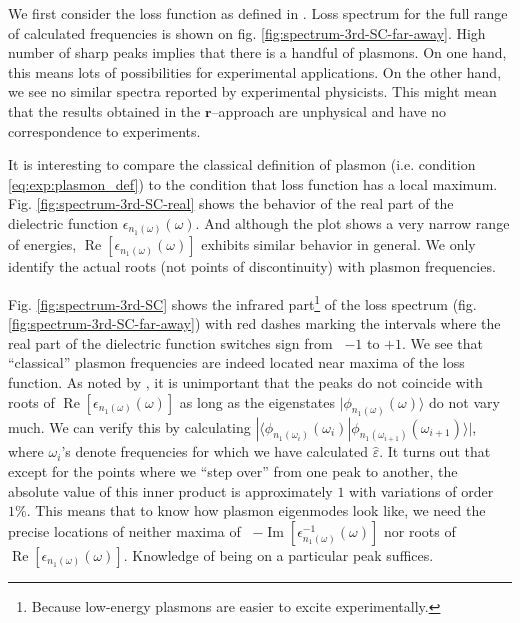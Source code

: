 \documentclass[a4paper,12pt]{article}
\begin{document}
    We first consider the loss function as defined in \cite{plasmonic2015}. Loss spectrum for the full range of calculated frequencies is shown on fig. \ref{fig:spectrum-3rd-SC-far-away}. High number of sharp peaks implies that there is a handful of plasmons. On one hand, this means lots of possibilities for experimental applications. On the other hand, we see no similar spectra reported by experimental physicists. This might mean that the results obtained in the $\mathbf{r}$--approach are unphysical and have no correspondence to experiments.
    
    It is interesting to compare the classical definition of plasmon (i.e. condition \eqref{eq:exp:plasmon_def}) to the condition that loss function has a local maximum. Fig. \ref{fig:spectrum-3rd-SC-real} shows the behavior of the real part of the dielectric function $\epsilon_{n_1(\omega)}(\omega)$. And although the plot shows a very narrow range of energies, $\operatorname{Re} [\epsilon_{n_1(\omega)}(\omega)]$ exhibits similar behavior in general. We only identify the actual roots (not points of discontinuity) with plasmon frequencies.
    
    Fig. \ref{fig:spectrum-3rd-SC} shows the infrared part\footnote{%
        Because low-energy plasmons are easier to excite experimentally. 
    } of the loss spectrum (fig. \ref{fig:spectrum-3rd-SC-far-away}) with red dashes marking the intervals where the real part of the dielectric function switches sign from \ $-1$ to $+1$. We see that ``classical'' plasmon frequencies are indeed located near maxima of the loss function. As noted by \cite{andersen2012spatially}, it is unimportant that the peaks do not coincide with roots of $\operatorname{Re} [\epsilon_{n_1(\omega)}(\omega)]$ as long as the eigenstates $|\phi_{n_1(\omega)}(\omega)\rangle$ do not vary much. We can verify this by calculating $|\langle \phi_{n_1(\omega_i)}(\omega_i) | \phi_{n_1(\omega_{i+1})}(\omega_{i+1}) \rangle|$, where $\omega_i$'s denote frequencies for which we have calculated $\hat\varepsilon$. It turns out that except for the points where we ``step over'' from one peak to another, the absolute value of this inner product is approximately $1$ with variations of order $1\%$. This means that to know how plasmon eigenmodes look like, we need the precise locations of neither  maxima of \ $-\operatorname{Im}[\epsilon_{n_1(\omega)}^{-1}(\omega)]$ nor roots of $\operatorname{Re} [\epsilon_{n_1(\omega)}(\omega)]$. Knowledge of being on a particular peak suffices. 
\end{document}
